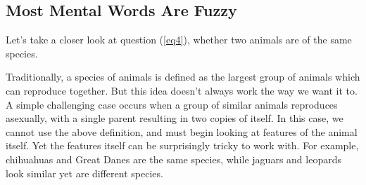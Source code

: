 \documentclass[11pt, oneside]{article}   	%
\begin{document}
\subsection{Most Mental Words Are Fuzzy}

Let's take a closer look at question (\ref{eq4}), whether two animals are of the
same species.

Traditionally, a species of animals is defined as the largest group of animals
which can reproduce together. But this idea doesn't always work the way we want
it to. A simple challenging case occurs when a group of similar animals
reproduces asexually, with a single parent resulting in two copies of itself. In
this case, we cannot use the above definition, and must begin looking at
features of the animal itself. Yet the features itself can be surprisingly
tricky to work with. For example, chihuahuas and Great Danes are the same
species, while jaguars and leopards look similar yet are different species.
\end{document}
